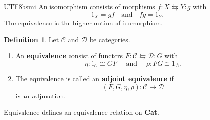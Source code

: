 \documentclass[12pt]{article}
\theoremstyle{definition}
\newtheorem{definition}{Definition}[section]
\newcommand\<{\langle}
\renewcommand\>{\rangle}
\begin{document}
\begin{CJK}{UTF8}{bsmi}
An isomorphism consists of morphisms $f:X\leftrightarrows Y:g$ with
\[
    1_X=gf
    \quad\text{and}\quad
    fg=1_Y.
\]
The equivalence is the higher notion of isomorphism.

\begin{definition}
    Let $\mathcal{C}$ and $\mathcal{D}$ be categories.
    \begin{enumerate}
        \item An \textbf{equivalence} consist of functors $F:\mathcal{C}\leftrightarrows\mathcal{D}:G$ with
        \[
            \eta:1_\mathcal{C}\cong GF
            \quad\text{ and }\quad
            \rho:FG\cong 1_\mathcal{D}.
        \]
        \item The equivalence is called an \textbf{adjoint equivalence} if $$(F, G, \eta, \rho):\mathcal{C}\to\mathcal{D}$$is an adjunction.
    \end{enumerate}
\end{definition}

Equivalence defines an equivalence relation on \textbf{Cat}.


\end{CJK}
\end{document}
